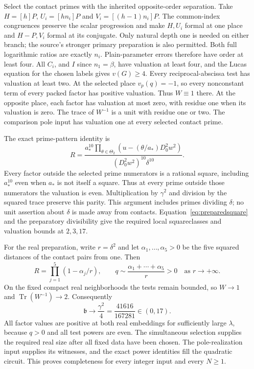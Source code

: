 \documentclass[11pt,a4paper]{article}
\DeclareMathOperator{\Tr}{Tr}\DeclareMathOperator{\Nm}{Nm}
\begin{document}
Select the contact primes with the inherited opposite-order separation.
Take $H=[h]P$, $U_i=[hn_i]P$ and $V_i=[(h-1)n_i]P$.
The common-index congruences preserve the scalar progression and make
$H,U_i$ formal at one place and $H-P,V_i$ formal at its conjugate.
Only natural depth one is needed on either branch; the source's stronger
primary preparation is also permitted. Both full logarithmic ratios
are exactly $n_i$. Plain-parameter errors therefore have order at least
four. All $C_i$, and $I$ since $n_1=\beta$, have valuation at least four,
and the Lucas equation for the chosen labels gives $v(G)\ge4$.
Every reciprocal-abscissa test has valuation at least two.
At the selected place $v_p(q)=-1$, so every nonconstant term of every
packed factor has positive valuation. Thus $W\equiv1$ there. At the
opposite place, each factor has valuation at most zero, with residue one
when its valuation is zero. The trace of $W^{-1}$ is a unit with residue
one or two. The comparison pole input has valuation one at every
selected contact prime.

The exact prime-pattern identity is
\[
 R=\frac{\displaystyle a_*^{10}\prod_{\theta\in\Theta_2}
          (u-(\theta/a_*)D_0^2w^2)}
        {(D_0^2w^2)^{10}\delta^{10}}.
\]
Every factor outside the selected prime numerators is a rational
square, including $a_*^{10}$ even when $a_*$ is not itself a square.
Thus at every prime outside those numerators the valuation is even. Multiplication by $\gamma^2$ and division by the squared trace preserve this parity. This argument includes primes dividing $\delta$;
no unit assertion about $\delta$ is made away from contacts.
Equation~\eqref{eq:preparedsquare} and the preparatory divisibility
give the required local squareclasses and valuation bounds at $2,3,17$.

For the real preparation, write $r=\delta^2$ and let
$\alpha_1,\ldots,\alpha_5>0$ be the five squared distances of the
contact pairs from one. Then
\[
 R=\prod_{j=1}^{5}(1-\alpha_j/r),\qquad
 q\sim\frac{\alpha_1+\cdots+\alpha_5}r>0
 \quad\text{as }r\longrightarrow+\infty.
\]
On the fixed compact real neighborhoods the tests remain bounded, so
$W\to1$ and $\Tr(W^{-1})\to2$. Consequently
\[
              \mathfrak b\longrightarrow\frac{\gamma^2}{4}
                              =\frac{41616}{167281}\in(0,17).
\]
All factor values are positive at both real embeddings for sufficiently
large $\lambda$, because $q>0$ and all test powers are even.
The simultaneous selection supplies the required real size after all
fixed data have been chosen. The pole-realization input supplies its
witnesses, and the exact power identities fill the quadratic circuit.
This proves completeness for every integer input and every $N\ge1$.
\end{document}
